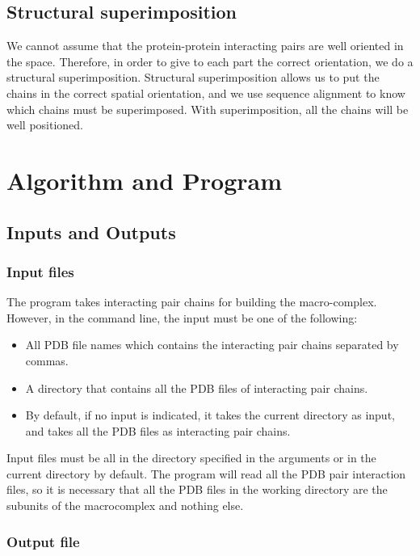 \documentclass[a4paper,10pt]{report}
\begin{document}
\section{Structural superimposition}



We cannot assume that the protein-protein interacting pairs are well oriented in the space. Therefore, in order to give to each part the correct orientation, we do a structural superimposition. Structural superimposition allows us to put the chains in the correct spatial orientation, and we use sequence alignment to know which chains must be superimposed. With superimposition, all the chains will be well positioned. 



\chapter{Algorithm and Program}


\section{Inputs and Outputs}

\subsection{Input files}

The program takes interacting pair chains for building the macro-complex. However, in the command line, the input must be one of the following:

\begin{itemize}
 \item All PDB file names which contains the interacting pair chains separated by commas.
 \item A directory that contains all the PDB files of interacting pair chains.
 \item By default, if no input is indicated, it takes the current directory as input, and takes all the PDB files as interacting pair chains.
\end{itemize}

\noindent
Input files must be all in the directory specified in the arguments or in the current directory by default. The program will read all the PDB pair interaction files, so it is necessary that all the PDB files in the working directory are the subunits of the macrocomplex and nothing else.

\subsection{Output file}
\end{document}
